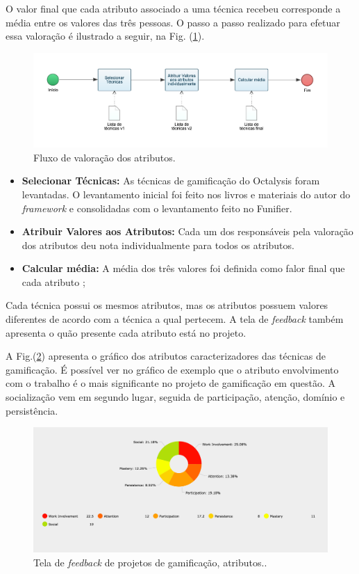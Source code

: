  O valor final que cada atributo associado a uma técnica recebeu corresponde a média entre os valores das três pessoas. O passo a passo realizado para efetuar essa valoração é ilustrado a seguir, na Fig. (\ref{fig12}).\newpage


\begin{figure}[h]
	\centering
		\includegraphics[keepaspectratio=true,scale=0.4]{figuras/fluxo.png}
	\caption{Fluxo de valoração dos atributos.\label{fig12}}
\end{figure}


\begin{itemize}
\item  \textbf {Selecionar Técnicas:} As técnicas de gamificação do Octalysis foram levantadas. O levantamento inicial foi feito nos livros e materiais do autor do \textit{framework} e consolidadas com o levantamento feito no Funifier.
\item  \textbf {Atribuir Valores aos Atributos:} Cada um dos responsáveis pela valoração dos atributos deu nota individualmente para todos os atributos. 
\item  \textbf {Calcular média:} A média dos três valores foi definida como falor final que cada atributo ;

\end{itemize}

Cada técnica possui os mesmos atributos, mas os atributos possuem valores diferentes de acordo com a técnica a qual pertecem. A tela de \textit{feedback} também apresenta o quão presente cada atributo está no projeto. 


A Fig.(\ref{fig13}) apresenta o gráfico dos atributos caracterizadores das técnicas de gamificação. É possível ver no gráfico de exemplo que o atributo envolvimento com o trabalho é o mais significante no projeto de gamificação em questão. A socialização vem em segundo lugar, seguida de participação, atenção, domínio e persistência.	


\begin{figure}[h]
	\centering
		\includegraphics[keepaspectratio=true,scale=0.35]{figuras/atributos.png}
	\caption{Tela de \textit{feedback} de projetos de gamificação, atributos..\label{fig13}}
\end{figure}

